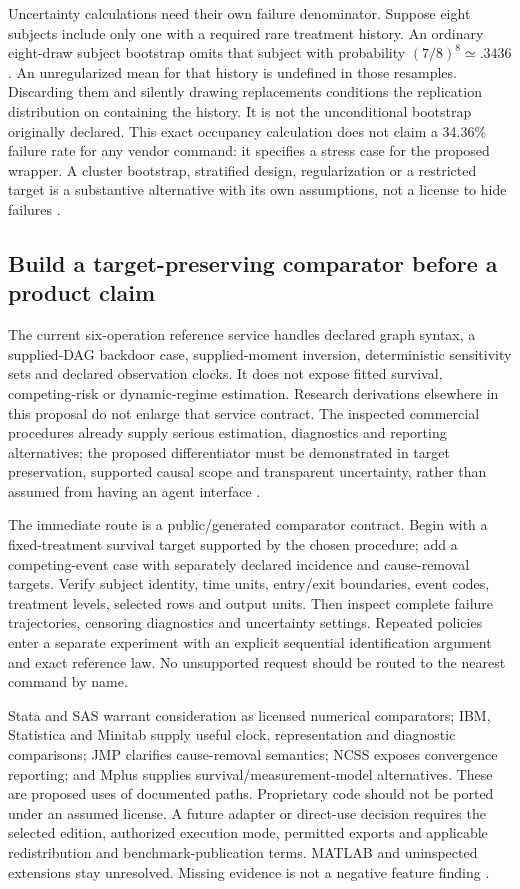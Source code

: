 Uncertainty calculations need their own failure denominator. Suppose eight
subjects include only one with a required rare treatment history. An ordinary
eight-draw subject bootstrap omits that subject with probability
$(7/8)^8\simeq.3436$. An unregularized mean for that history is undefined in
those resamples. Discarding them and silently drawing replacements conditions
the replication distribution on containing the history. It is not the
unconditional bootstrap originally declared. This exact occupancy calculation
does not claim a 34.36\% failure rate for any vendor command: it specifies a
stress case for the proposed wrapper. A cluster bootstrap, stratified design,
regularization or a restricted target is a substantive alternative with its
own assumptions, not a license to hide failures \citep{exec14_survival_exact}.

\subsection{Build a target-preserving comparator before a product claim}

The current six-operation reference service handles declared graph syntax,
a supplied-DAG backdoor case, supplied-moment inversion, deterministic
sensitivity sets and declared observation clocks. It does not expose fitted
survival, competing-risk or dynamic-regime estimation. Research derivations
elsewhere in this proposal do not enlarge that service contract. The inspected
commercial procedures already supply serious estimation, diagnostics and
reporting alternatives; the proposed differentiator must be demonstrated in
target preservation, supported causal scope and transparent uncertainty,
rather than assumed from having an agent interface
\citep{exec14_survival_survey}.

The immediate route is a public/generated comparator contract. Begin with a
fixed-treatment survival target supported by the chosen procedure; add a
competing-event case with separately declared incidence and cause-removal
targets. Verify subject identity, time units, entry/exit boundaries, event
codes, treatment levels, selected rows and output units. Then inspect complete
failure trajectories, censoring diagnostics and uncertainty settings. Repeated
policies enter a separate experiment with an explicit sequential identification
argument and exact reference law. No unsupported request should be routed to
the nearest command by name.

Stata and SAS warrant consideration as licensed numerical comparators;
IBM, Statistica and Minitab supply useful clock, representation and diagnostic
comparisons; JMP clarifies cause-removal semantics; NCSS exposes convergence
reporting; and Mplus supplies survival/measurement-model alternatives.
These are proposed uses of documented paths. Proprietary code should not be
ported under an assumed license. A future adapter or direct-use decision
requires the selected edition, authorized execution mode, permitted exports
and applicable redistribution and benchmark-publication terms. MATLAB and
uninspected extensions stay unresolved. Missing evidence is not a negative
feature finding \citep{exec14_survival_survey}.

